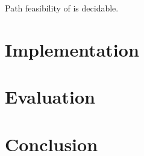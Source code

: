 \documentclass{llncs}
\begin{document}
\begin{corollary}
Path feasibility of {\cslint} is decidable.
\end{corollary}


\section{Implementation}

\section{Evaluation}

\section{Conclusion}




\iffalse
\newpage
\setcounter{page}{1}

\begin{appendix}

\end{appendix}

\fi
\end{document}
